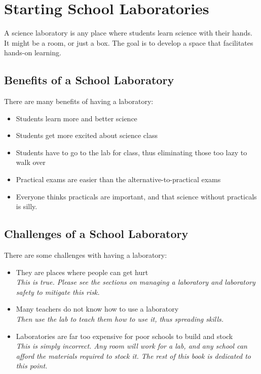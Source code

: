 \chapter{Starting School Laboratories}

A science laboratory is any place where students learn science with their hands. It might be a room, 
or just a box. The goal is to develop a space that facilitates hands-on learning.

\section{Benefits of a School Laboratory}
There are many benefits of having a laboratory:
\begin{itemize}
\item{Students learn more and better science}
\item{Students get more excited about science class}
\item{Students have to go to the lab for class, thus eliminating those too lazy to walk over}
\item{Practical exams are easier than the alternative-to-practical exams}
\item{Everyone thinks practicals are important, and that science without practicals is silly.}
\end{itemize}

\section{Challenges of a School Laboratory}
There are some challenges with having a laboratory:
\begin{itemize}
\item{They are places where people can get hurt\\
\textit{This is true. Please see the sections on managing a laboratory and laboratory safety 
to mitigate this risk.}}
\item{Many teachers do not know how to use a laboratory\\
\textit{Then use the lab to teach them how to use it, thus spreading skills.}}
\item{Laboratories are far too expensive for poor schools to build and stock\\
\textit{This is simply incorrect. Any room will work for a lab, and any school can afford the materials required to stock it. The rest of this book is dedicated to this point.}}
\end{itemize}

